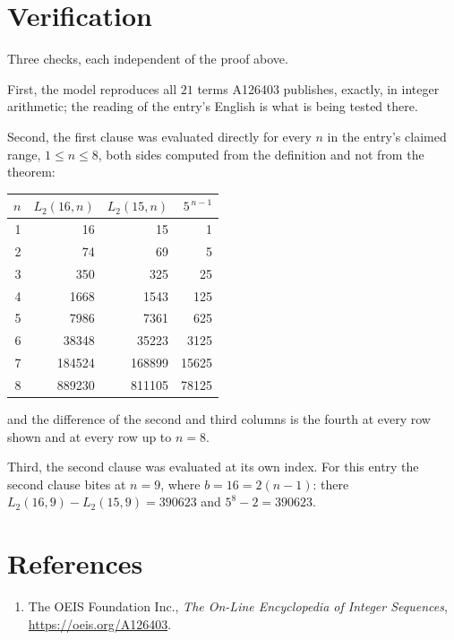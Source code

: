 \documentclass[11pt,a4paper]{article}
\theoremstyle{plain}
\theoremstyle{definition}
\begin{document}
\section{Verification}

Three checks, each independent of the proof above.

First, the model reproduces all $21$ terms A126403 publishes, exactly, in integer
arithmetic; the reading of the entry's English is what is being tested there.

Second, the first clause was evaluated directly for every $n$ in the entry's claimed range,
$1\le n\le8$, both sides computed from the definition and not from the theorem:

\begin{center}
\begin{tabular}{rrrr}
$n$ & $L_{2}(16,n)$ & $L_{2}(15,n)$ & $5^{\,n-1}$ \\ \hline
1 & 16 & 15 & 1 \\
2 & 74 & 69 & 5 \\
3 & 350 & 325 & 25 \\
4 & 1668 & 1543 & 125 \\
5 & 7986 & 7361 & 625 \\
6 & 38348 & 35223 & 3125 \\
7 & 184524 & 168899 & 15625 \\
8 & 889230 & 811105 & 78125 \\
\end{tabular}
\end{center}

\noindent and the difference of the second and third columns is the fourth at every row shown
and at every row up to $n=8$.

Third, the second clause was evaluated at its own index. For this entry the second clause bites at $n=9$, where $b=16=2(n-1)$: there $L_{2}(16,9)-L_{2}(15,9)=390623$ and $5^{8}-2=390623$.

\section*{References}
\begin{enumerate}
\item The OEIS Foundation Inc., \emph{The On-Line Encyclopedia of Integer Sequences},
\url{https://oeis.org/A126403}.
\end{enumerate}
\end{document}
